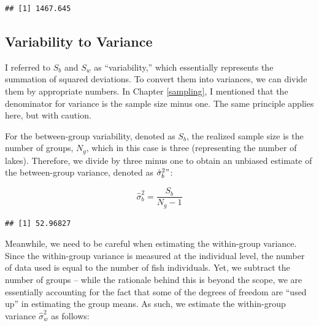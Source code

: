 \documentclass[
]{book}
\newenvironment{Shaded}{\begin{snugshade}}{\end{snugshade}}
\newcommand{\CommentTok}[1]{\textcolor[rgb]{0.56,0.35,0.01}{\textit{#1}}}
\newcommand{\DecValTok}[1]{\textcolor[rgb]{0.00,0.00,0.81}{#1}}
\newcommand{\FunctionTok}[1]{\textcolor[rgb]{0.00,0.00,0.00}{#1}}
\newcommand{\NormalTok}[1]{#1}
\newcommand{\OtherTok}[1]{\textcolor[rgb]{0.56,0.35,0.01}{#1}}
\newcommand{\SpecialCharTok}[1]{\textcolor[rgb]{0.00,0.00,0.00}{#1}}
\begin{document}
\begin{verbatim}
## [1] 1467.645
\end{verbatim}

\hypertarget{variability-to-variance}{%
\subsection{Variability to Variance}\label{variability-to-variance}}

I referred to \(S_b\) and \(S_w\) as ``variability,'' which essentially represents the summation of squared deviations. To convert them into variances, we can divide them by appropriate numbers. In Chapter \ref{sampling}, I mentioned that the denominator for variance is the sample size minus one. The same principle applies here, but with caution.

For the between-group variability, denoted as \(S_b\), the realized sample size is the number of groups, \(N_g\), which in this case is three (representing the number of lakes). Therefore, we divide by three minus one to obtain an unbiased estimate of the between-group variance, denoted as \(\hat{\sigma}_b^2"\):

\[
\hat{\sigma}^2_b = \frac{S_b}{N_g-1}
\]

\begin{Shaded}
\end{Shaded}

\begin{verbatim}
## [1] 52.96827
\end{verbatim}

Meanwhile, we need to be careful when estimating the within-group variance. Since the within-group variance is measured at the individual level, the number of data used is equal to the number of fish individuals. Yet, we subtract the number of groups -- while the rationale behind this is beyond the scope, we are essentially accounting for the fact that some of the degrees of freedom are ``used up'' in estimating the group means. As such, we estimate the within-group variance \(\hat{\sigma}^2_w\) as follows:
\end{document}
